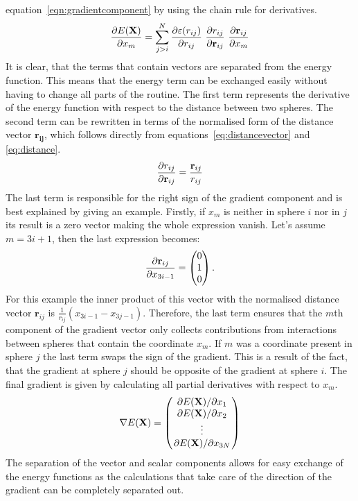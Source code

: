 equation~\eqref{eqn:gradientcomponent} by using the chain rule for derivatives.
%
\begin{align}
    \pdv{E(\mathbf{X})}{x_m}=\sum_{j>i}^N\pdv{\varepsilon(r_{ij})}{r_{ij}}\ \pdv{r_{ij}}{\mathbf{r}_{ij}}\ \pdv{\mathbf{r}_{ij}}{x_m}\label{eqn:gradientcomponent}
\end{align}%
%
It is clear, that the terms that contain vectors are separated from the energy
function. This means that the energy term can be exchanged easily without
having to change all parts of the routine. The first term represents the
derivative of the energy function with respect to the distance between two
spheres. The second term can be rewritten in terms of the normalised form of
the distance vector $\mathbf{r_{ij}}$, which follows directly from
equations~\eqref{eq:distancevector} and \eqref{eq:distance}.
%
\begin{align}
    \pdv{r_{ij}}{\mathbf{r}_{ij}}=\frac{\mathbf{r}_{ij}}{r_{ij}}
\end{align}%
%
The last term is responsible for the right sign of the gradient component and
is best explained by giving an example. Firstly, if $x_m$ is neither in sphere
$i$ nor in $j$ its result is a zero vector making the whole expression vanish.
Let's assume $m=3i+1$, then the last expression becomes:
%
\begin{align}
    \pdv{\mathbf{r}_{ij}}{x_{3i-1}}=
    \begin{pmatrix}
        0\\1\\0
    \end{pmatrix}.
\end{align}%
%
For this example the inner product of this vector with the normalised distance
vector $\mathbf{r}_{ij}$ is $\frac{1}{r_{ij}}(x_{3i-1} - x_{3j-1})$. Therefore,
the last term ensures that the $m$th component of the gradient vector only
collects contributions from interactions between spheres that contain the
coordinate $x_m$. If $m$ was a coordinate present in sphere $j$ the last term
swaps the sign of the gradient. This is a result of the fact, that the gradient
at sphere $j$ should be opposite of the gradient at sphere $i$. The final
gradient is given by calculating all partial derivatives with respect to $x_m$.
%
\begin{align}
    \nabla E(\mathbf{X})=
    \begin{pmatrix}
        \pdv*{E(\mathbf{X})}{x_1}\\
        \pdv*{E(\mathbf{X})}{x_2}\\
        \vdots\\
        \pdv*{E(\mathbf{X})}{x_{3N}}
    \end{pmatrix}
\end{align}
%
The separation of the vector and scalar components allows for easy exchange of
the energy functions as the calculations that take care of the direction of the
gradient can be completely separated out. 


